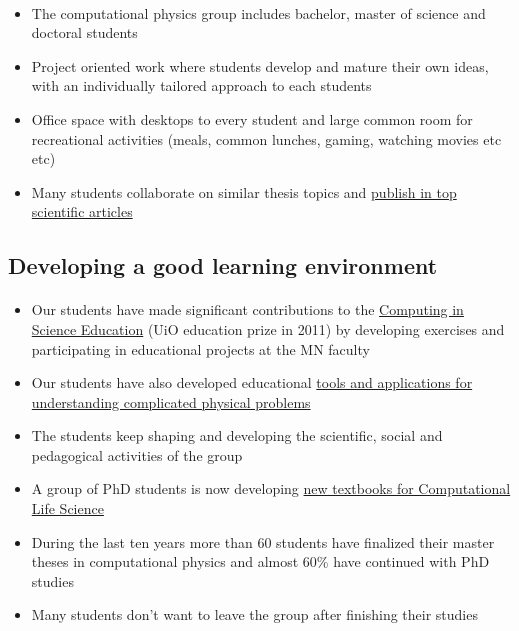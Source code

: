 \documentclass[%
oneside,                 %
final,                   %
10pt]{article}
\begin{document}
\paragraph{}
\begin{itemize}
\item The computational physics group includes bachelor, master of science and doctoral students

\item Project oriented work where students develop and mature their own ideas, with an individually tailored approach to each students

\item Office space with desktops to every student and large common room for recreational activities (meals, common lunches, gaming, watching movies etc etc)

\item Many students collaborate on similar  thesis topics and \href{{http://www.dn.no/talent/2014/06/12/Utdannelse/sommervikar-ble-toppforsker}}{publish in top scientific articles}
\end{itemize}

\noindent





\subsection*{Developing a good learning environment}

\paragraph{}
\begin{itemize}
\item Our students have made significant contributions to  the \href{{http://www.mn.uio.no/english/about/collaboration/cse/}}{Computing in Science Education}  (UiO education prize in 2011) by developing exercises and participating in educational projects at the MN faculty

\item Our students have also developed educational \href{{http://www.mn.uio.no/fysikk/om/aktuelt/aktuelle-saker/2015/realfagsapper.html}}{tools and applications for understanding complicated physical problems} 

\item The students keep shaping and developing the scientific, social and pedagogical activities of the group

\item A group of PhD students is now developing \href{{https://github.com/CINPLA/ibvcse}}{new textbooks for Computational Life Science}

\item During the last ten years more than 60 students have finalized their master theses in computational physics and  almost 60\% have continued with PhD studies

\item Many students don't want to leave the group after finishing their studies
\end{itemize}
\end{document}
